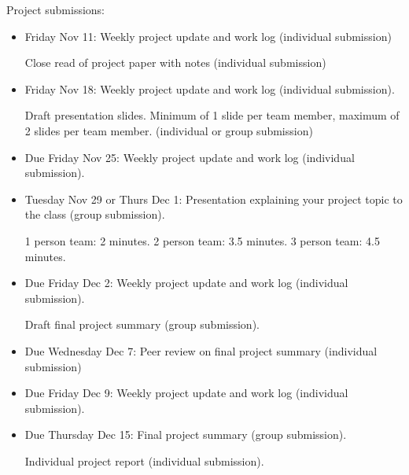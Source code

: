 \documentclass[12pt,letterpaper,noanswers]{exam}
\begin{document}
\noindent Project submissions:
\begin{itemize}
    
    \item Friday Nov 11: Weekly project update and work log (individual submission)
    
    Close read of project paper with notes (individual submission)

    \item Friday Nov 18: Weekly project update and work log (individual submission).  
    
    Draft presentation slides.  Minimum of 1 slide per team member, maximum of 2 slides per team member.  (individual or group submission)
    \item Due Friday Nov 25: Weekly project update and work log (individual submission).  
    \item Tuesday Nov 29 or Thurs Dec 1: Presentation explaining your project topic to the class (group submission).  
    
    1 person team: 2 minutes.  2 person team: 3.5 minutes.  3 person team: 4.5 minutes.
    \item Due Friday Dec 2: Weekly project update and work log (individual submission).  
    
    Draft final project summary (group submission).
    \item Due Wednesday Dec 7: Peer review on final project summary (individual submission)
    \item Due Friday Dec 9: Weekly project update and work log (individual submission).
    \item Due Thursday Dec 15: Final project summary (group submission).  
    
    Individual project report (individual submission).
\end{itemize}
\end{document}
